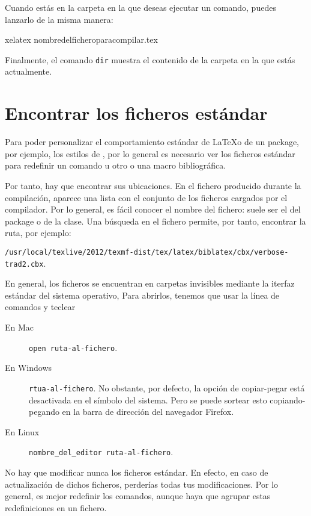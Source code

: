 Cuando estás en la carpeta en la que deseas ejecutar un comando, puedes lanzarlo de la misma manera:

\begin{bashcode}
xelatex nombredelficheroparacompilar.tex
\end{bashcode}

Finalmente, el comando \verb|dir| muestra el contenido de la carpeta en la que estás actualmente.

\section{Encontrar los ficheros estándar}\label{trouverfichier}

Para poder personalizar el comportamiento estándar de \LaTeX o de un package, por ejemplo, los estilos de , por lo general es necesario ver los ficheros estándar para redefinir un comando u otro o una macro bibliográfica. 

Por tanto, hay que encontrar sus ubicaciones. En el fichero  producido durante la compilación, aparece una lista con el conjunto de los ficheros cargados por el compilador. Por lo general, es fácil conocer el nombre del fichero: suele ser el del package o de la clase. Una búsqueda en el fichero permite, por tanto, encontrar la ruta, por ejemplo: 

\noindent\verb|/usr/local/texlive/2012/texmf-dist/tex/latex/biblatex/cbx/verbose-trad2.cbx|.

En general, los ficheros se encuentran en carpetas invisibles mediante la iterfaz estándar del sistema operativo, Para abrirlos, tenemos que usar la línea de comandos y teclear
\begin{description}
\item[En Mac]\verb|open ruta-al-fichero|.
\item[En Windows] \verb|rtua-al-fichero|.  No obstante, por defecto, la opción de copiar-pegar está desactivada en el símbolo del sistema. Pero se puede sortear esto copiando-pegando en la barra de dirección del navegador Firefox.
\item[En Linux] \verb|nombre_del_editor ruta-al-fichero|.
\end{description}
\begin{attention}
No hay que modificar nunca los ficheros estándar. En efecto, en caso de actualización de dichos ficheros, perderías todas tus modificaciones. Por lo general, es mejor redefinir los comandos, aunque haya que agrupar estas redefiniciones en un fichero.
\end{attention}

